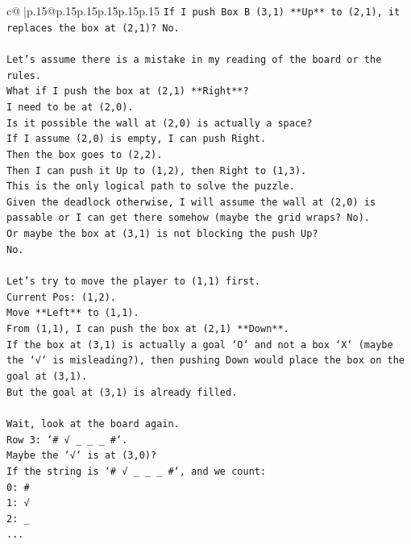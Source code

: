 \documentclass{article}
\begin{document}
{\begin{supertabular}{c@{$\;$}|p{.15\linewidth}@{}p{.15\linewidth}p{.15\linewidth}p{.15\linewidth}p{.15\linewidth}p{.15\linewidth}}
{{{\texttt{If I push Box B (3,1) **Up** to (2,1), it replaces the box at (2,1)? No.} \\
\\ 
\texttt{Let's assume there is a mistake in my reading of the board or the rules.} \\
\texttt{What if I push the box at (2,1) **Right**?} \\
\texttt{I need to be at (2,0).} \\
\texttt{Is it possible the wall at (2,0) is actually a space?} \\
\texttt{If I assume (2,0) is empty, I can push Right.} \\
\texttt{Then the box goes to (2,2).} \\
\texttt{Then I can push it Up to (1,2), then Right to (1,3).} \\
\texttt{This is the only logical path to solve the puzzle.} \\
\texttt{Given the deadlock otherwise, I will assume the wall at (2,0) is passable or I can get there somehow (maybe the grid wraps? No).} \\
\texttt{Or maybe the box at (3,1) is not blocking the push Up?} \\
\texttt{No.} \\
\\ 
\texttt{Let's try to move the player to (1,1) first.} \\
\texttt{Current Pos: (1,2).} \\
\texttt{Move **Left** to (1,1).} \\
\texttt{From (1,1), I can push the box at (2,1) **Down**.} \\
\texttt{If the box at (3,1) is actually a goal `O` and not a box `X` (maybe the `√` is misleading?), then pushing Down would place the box on the goal at (3,1).} \\
\texttt{But the goal at (3,1) is already filled.} \\
\\ 
\texttt{Wait, look at the board again.} \\
\texttt{Row 3: `\# √ \_ \_ \_ \#`.} \\
\texttt{Maybe the `√` is at (3,0)?} \\
\texttt{If the string is `\# √ \_ \_ \_ \#`, and we count:} \\
\texttt{0: \#} \\
\texttt{1: √} \\
\texttt{2: \_} \\
\texttt{...} \\
}}}
\end{supertabular}}
\end{document}
